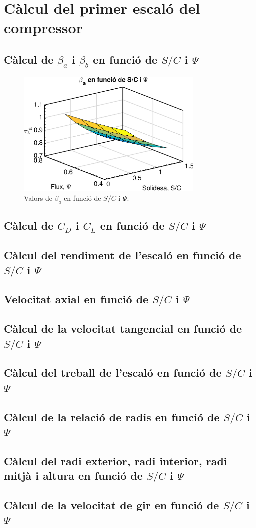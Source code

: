 \section{Càlcul del primer escaló del compressor}

\subsection{Càlcul de $\beta_a$ i $\beta_b$ en funció de $S/C$ i $\Psi$}
\begin{figure}[H]
	\centering
	\includegraphics[width=0.8\textwidth]{./code/figures/parametres/betA}
	\caption{Valors de $\beta_a$ en funció de $S/C$ i $\Psi$.}
	\label{betA}
\end{figure}

\subsection{Càlcul de $C_D$ i $C_L$ en funció de $S/C$ i $\Psi$}

\subsection{Càlcul del rendiment de l'escaló en funció de $S/C$ i $\Psi$}

\subsection{Velocitat axial en funció de $S/C$ i $\Psi$}

\subsection{Càlcul de la velocitat tangencial en funció de $S/C$ i $\Psi$}

\subsection{Càlcul del treball de l'escaló en funció de $S/C$ i $\Psi$}

\subsection{Càlcul de la relació de radis en funció de $S/C$ i $\Psi$}

\subsection{Càlcul del radi exterior, radi interior, radi mitjà i altura en funció de $S/C$ i $\Psi$}

\subsection{Càlcul de la velocitat de gir en funció de $S/C$ i $\Psi$}